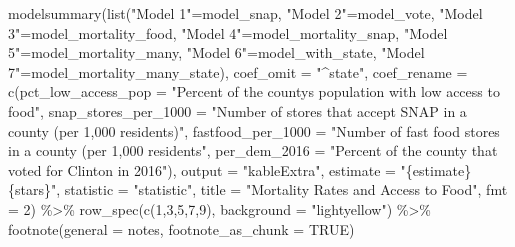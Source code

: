 \documentclass[
]{article}
\newenvironment{Shaded}{\begin{snugshade}}{\end{snugshade}}
\newcommand{\AttributeTok}[1]{\textcolor[rgb]{0.77,0.63,0.00}{#1}}
\newcommand{\ConstantTok}[1]{\textcolor[rgb]{0.00,0.00,0.00}{#1}}
\newcommand{\DecValTok}[1]{\textcolor[rgb]{0.00,0.00,0.81}{#1}}
\newcommand{\FunctionTok}[1]{\textcolor[rgb]{0.00,0.00,0.00}{#1}}
\newcommand{\NormalTok}[1]{#1}
\newcommand{\OtherTok}[1]{\textcolor[rgb]{0.56,0.35,0.01}{#1}}
\newcommand{\SpecialCharTok}[1]{\textcolor[rgb]{0.00,0.00,0.00}{#1}}
\newcommand{\StringTok}[1]{\textcolor[rgb]{0.31,0.60,0.02}{#1}}
\begin{document}
\begin{Shaded}
\begin{Highlighting}[]
\FunctionTok{modelsummary}\NormalTok{(}\FunctionTok{list}\NormalTok{(}\StringTok{"Model 1"}\OtherTok{=}\NormalTok{model\_snap,}
                  \StringTok{"Model 2"}\OtherTok{=}\NormalTok{model\_vote,}
                  \StringTok{"Model 3"}\OtherTok{=}\NormalTok{model\_mortality\_food,}
                  \StringTok{"Model 4"}\OtherTok{=}\NormalTok{model\_mortality\_snap,}
                  \StringTok{"Model 5"}\OtherTok{=}\NormalTok{model\_mortality\_many,}
                  \StringTok{"Model 6"}\OtherTok{=}\NormalTok{model\_with\_state,}
                  \StringTok{"Model 7"}\OtherTok{=}\NormalTok{model\_mortality\_many\_state),}
             \AttributeTok{coef\_omit =} \StringTok{"\^{}state"}\NormalTok{,}
             \AttributeTok{coef\_rename =} \FunctionTok{c}\NormalTok{(}\AttributeTok{pct\_low\_access\_pop =} \StringTok{"Percent of the county\textquotesingle{}s population with low access to food"}\NormalTok{, }
                             \AttributeTok{snap\_stores\_per\_1000 =} \StringTok{"Number of stores that accept SNAP in a county (per 1,000 residents)"}\NormalTok{, }
                             \AttributeTok{fastfood\_per\_1000 =} \StringTok{"Number of fast food stores in a county (per 1,000 residents"}\NormalTok{, }
                             \AttributeTok{per\_dem\_2016 =} \StringTok{"Percent of the county that voted for Clinton in 2016"}\NormalTok{),}
             \AttributeTok{output =} \StringTok{"kableExtra"}\NormalTok{,}
             \AttributeTok{estimate =} \StringTok{"\{estimate\} \{stars\}"}\NormalTok{,}
             \AttributeTok{statistic =} \StringTok{"statistic"}\NormalTok{,}
             \AttributeTok{title =} \StringTok{"Mortality Rates and Access to Food"}\NormalTok{,}
             \AttributeTok{fmt =}  \DecValTok{2}\NormalTok{) }\SpecialCharTok{\%\textgreater{}\%} 
    \FunctionTok{row\_spec}\NormalTok{(}\FunctionTok{c}\NormalTok{(}\DecValTok{1}\NormalTok{,}\DecValTok{3}\NormalTok{,}\DecValTok{5}\NormalTok{,}\DecValTok{7}\NormalTok{,}\DecValTok{9}\NormalTok{), }\AttributeTok{background =} \StringTok{"lightyellow"}\NormalTok{) }\SpecialCharTok{\%\textgreater{}\%} 
    \FunctionTok{footnote}\NormalTok{(}\AttributeTok{general =}\NormalTok{ notes, }\AttributeTok{footnote\_as\_chunk =} \ConstantTok{TRUE}\NormalTok{)}
\end{Highlighting}
\end{Shaded}
\end{document}
